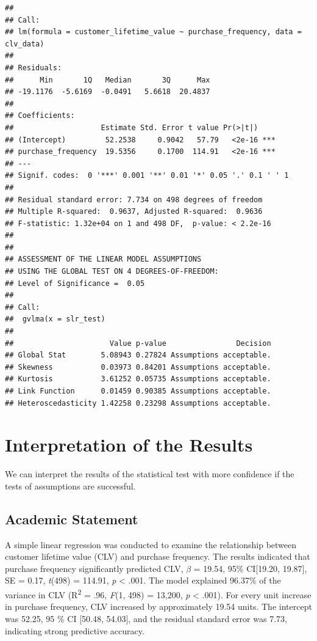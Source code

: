 \documentclass[
]{article}
\begin{document}
\begin{verbatim}
## 
## Call:
## lm(formula = customer_lifetime_value ~ purchase_frequency, data = clv_data)
## 
## Residuals:
##      Min       1Q   Median       3Q      Max 
## -19.1176  -5.6169  -0.0491   5.6618  20.4837 
## 
## Coefficients:
##                    Estimate Std. Error t value Pr(>|t|)    
## (Intercept)         52.2538     0.9042   57.79   <2e-16 ***
## purchase_frequency  19.5356     0.1700  114.91   <2e-16 ***
## ---
## Signif. codes:  0 '***' 0.001 '**' 0.01 '*' 0.05 '.' 0.1 ' ' 1
## 
## Residual standard error: 7.734 on 498 degrees of freedom
## Multiple R-squared:  0.9637, Adjusted R-squared:  0.9636 
## F-statistic: 1.32e+04 on 1 and 498 DF,  p-value: < 2.2e-16
## 
## 
## ASSESSMENT OF THE LINEAR MODEL ASSUMPTIONS
## USING THE GLOBAL TEST ON 4 DEGREES-OF-FREEDOM:
## Level of Significance =  0.05 
## 
## Call:
##  gvlma(x = slr_test) 
## 
##                      Value p-value                Decision
## Global Stat        5.08943 0.27824 Assumptions acceptable.
## Skewness           0.03973 0.84201 Assumptions acceptable.
## Kurtosis           3.61252 0.05735 Assumptions acceptable.
## Link Function      0.01459 0.90385 Assumptions acceptable.
## Heteroscedasticity 1.42258 0.23298 Assumptions acceptable.
\end{verbatim}

\section{Interpretation of the
Results}\label{interpretation-of-the-results}

We can interpret the results of the statistical test with more
confidence if the tests of assumptions are successful.

\subsection{Academic Statement}\label{academic-statement}

A simple linear regression was conducted to examine the relationship
between customer lifetime value (CLV) and purchase frequency. The
results indicated that purchase frequency significantly predicted CLV,
\(\beta\) = 19.54, 95\% CI{[}19.20, 19.87{]}, SE = 0.17, \emph{t}(498) =
114.91, \emph{p} \textless{} .001. The model explained 96.37\% of the
variance in CLV (R\textsuperscript{2} = .96, \emph{F}(1, 498) = 13,200,
\emph{p} \textless{} .001). For every unit increase in purchase
frequency, CLV increased by approximately 19.54 units. The intercept was
52.25, 95 \% CI {[}50.48, 54.03{]}, and the residual standard error was
7.73, indicating strong predictive accuracy.
\end{document}
